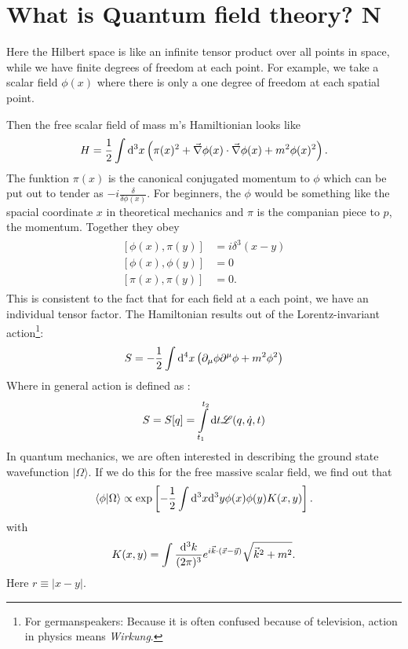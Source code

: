 \section{What is Quantum field theory? \textbf{N}}
	Here the Hilbert space is like an infinite tensor product over all points in space, while we have finite degrees of freedom at each point. 
For example, we take a scalar field $\phi(x)$ where there is only a one degree of freedom at each spatial point. 

	Then the free scalar field of mass m's Hamiltionian looks like
		\begin{equation}
			H=\frac{1}{2}\int \mathrm{d}^3 x \left(\pi(x)^2 + \vec{\nabla}\phi(x) \cdot \vec{\nabla}\phi(x) + m^2\phi(x)^2 \right).
		\end{equation}
	The funktion $\pi(x)$ is the canonical conjugated momentum to $\phi$ which can be put out to tender as $-i\frac{\delta}{\delta\phi(x)}$. For beginners, the $\phi$ would be something like the spacial coordinate $x$ in theoretical mechanics and $\pi$ is the companian piece to $p$, the momentum.
	Together they obey
		\begin{align}
			\begin{split}
				[\phi(x),\pi(y)]&=i \delta^3(x-y) \\
				[\phi(x),\phi(y)]&=0 \\
				[\pi(x),\pi(y)]&=0.
			\end{split}
		\end{align}
	This is consistent to the fact that for each field at a each point, we have an individual tensor factor.		
	The Hamiltonian results out of the Lorentz-invariant action\footnote{For germanspeakers: Because it is often confused because of television, action in physics means \textit{Wirkung}.}:
		\begin{equation}
			S=-\frac{1}{2} \int \mathrm{d}^4 x \left(\partial_\mu \phi \partial^\mu \phi + m^2\phi^2 \right)
		\end{equation}
	Where in general action is defined as \cite{MechanikFliesbach}: 
		\begin{equation} 
			S=S[q]= \int\limits_{t_1}^{t_2} \mathrm{d} t \mathscr{L}(q,\dot q,t)
		\end{equation} 
	In quantum mechanics, we are often interested in describing the ground state wavefunction $|\Omega\rangle$. If we do this for the free massive scalar field, we find out that \marginpar{[7]}
		\begin{equation}
			\langle\phi| \Omega\rangle \propto \exp\left[-\frac{1}{2} \int \mathrm{d}^3 x \mathrm{d}^3 y \phi(x)\phi(y) K(x,y)\right].
		\end{equation}
	with
		\begin{equation}
			K(x,y)=\int \frac{\mathrm{d}^3 k}{(2\pi)^3} e^{i\vec{k} \cdot (\vec{x}-\vec{y})} \sqrt{\vec{k}^2+m^2}.
		\end{equation}
	Here $r \equiv |x-y|$.
	
